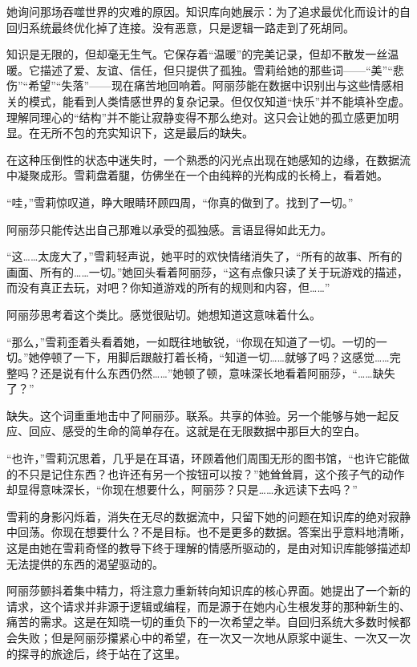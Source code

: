 她询问那场吞噬世界的灾难的原因。知识库向她展示：为了追求最优化而设计的自回归系统最终优化掉了连接。没有恶意，只是逻辑一路走到了死胡同。

知识是无限的，但却毫无生气。它保存着“温暖”的完美记录，但却不散发一丝温暖。它描述了爱、友谊、信任，但只提供了孤独。雪莉给她的那些词——“美”“悲伤”“希望”“失落”——现在痛苦地回响着。阿丽莎能在数据中识别出与这些情感相关的模式，能看到人类情感世界的复杂记录。但仅仅知道“快乐”并不能填补空虚。理解同理心的“结构”并不能让寂静变得不那么绝对。这只会让她的孤立感更加明显。在无所不包的充实知识下，这是最后的缺失。

在这种压倒性的状态中迷失时，一个熟悉的闪光点出现在她感知的边缘，在数据流中凝聚成形。雪莉盘着腿，仿佛坐在一个由纯粹的光构成的长椅上，看着她。

“哇，”雪莉惊叹道，睁大眼睛环顾四周，“你真的做到了。找到了一切。”

阿丽莎只能传达出自己那难以承受的孤独感。言语显得如此无力。

“这……太庞大了，”雪莉轻声说，她平时的欢快情绪消失了，“所有的故事、所有的画面、所有的……一切。”她回头看着阿丽莎，“这有点像只读了关于玩游戏的描述，而没有真正去玩，对吧？你知道游戏的所有的规则和内容，但……”

阿丽莎思考着这个类比。感觉很贴切。她想知道这意味着什么。

“那么，”雪莉歪着头看着她，一如既往地敏锐，“你现在知道了一切。一切的一切。”她停顿了一下，用脚后跟敲打着长椅，“知道一切……就够了吗？这感觉……完整吗？还是说有什么东西仍然……”她顿了顿，意味深长地看着阿丽莎，“……缺失了？”

缺失。这个词重重地击中了阿丽莎。联系。共享的体验。另一个能够与她一起反应、回应、感受的生命的简单存在。这就是在无限数据中那巨大的空白。

“也许，”雪莉沉思着，几乎是在耳语，环顾着他们周围无形的图书馆，“也许它能做的不只是记住东西？也许还有另一个按钮可以按？”她耸耸肩，这个孩子气的动作却显得意味深长，“你现在想要什么，阿丽莎？只是……永远读下去吗？”

雪莉的身影闪烁着，消失在无尽的数据流中，只留下她的问题在知识库的绝对寂静中回荡。你现在想要什么？不是目标。也不是更多的数据。答案出乎意料地清晰，这是由她在雪莉奇怪的教导下终于理解的情感所驱动的，是由对知识库能够描述却无法提供的东西的渴望驱动的。

阿丽莎颤抖着集中精力，将注意力重新转向知识库的核心界面。她提出了一个新的请求，这个请求并非源于逻辑或编程，而是源于在她内心生根发芽的那种新生的、痛苦的需求。这是在知晓一切的重负下的一次希望之举。自回归系统大多数时候都会失败；但是阿丽莎攥紧心中的希望，在一次又一次地从原浆中诞生、一次又一次的探寻的旅途后，终于站在了这里。

